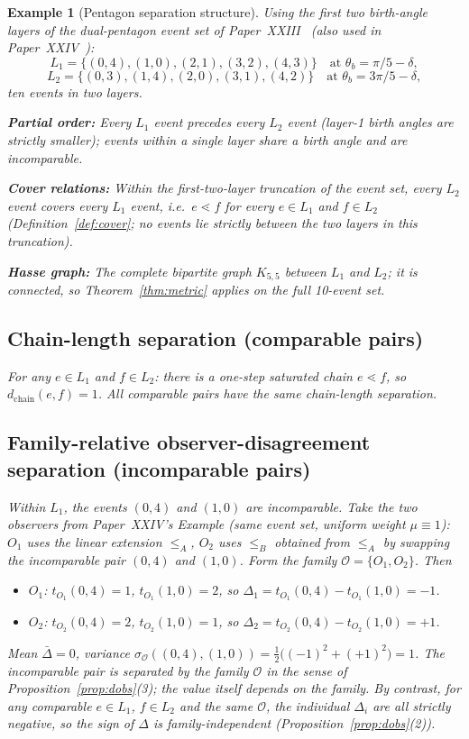 \documentclass[12pt]{article}
\newtheorem{example}[theorem]{Example}
\newcommand{\Ocal}{\mathcal{O}}
\begin{document}
\begin{example}[Pentagon separation structure]\label{ex:pentagon}
Using the first two birth-angle layers of the dual-pentagon event set of Paper~XXIII~\citep{SmartXXIII} (also used in Paper~XXIV~\citep{SmartXXIV}):
\[
    L_1 = \{(0,4),(1,0),(2,1),(3,2),(4,3)\} \quad \text{at } \theta_b = \pi/5 - \delta,
\]
\[
    L_2 = \{(0,3),(1,4),(2,0),(3,1),(4,2)\} \quad \text{at } \theta_b = 3\pi/5 - \delta,
\]
ten events in two layers.

\textbf{Partial order:} Every $L_1$ event precedes every $L_2$ event (layer-1 birth angles are strictly smaller); events within a single layer share a birth angle and are incomparable.

\textbf{Cover relations:} Within the first-two-layer truncation of the event set, every $L_2$ event covers every $L_1$ event, i.e.\ $e \lessdot f$ for every $e \in L_1$ and $f \in L_2$ (Definition~\ref{def:cover}; no events lie strictly between the two layers in this truncation).

\textbf{Hasse graph:} The complete bipartite graph $K_{5,5}$ between $L_1$ and $L_2$; it is connected, so Theorem~\ref{thm:metric} applies on the full 10-event set.

\subsection*{Chain-length separation (comparable pairs)}

For any $e \in L_1$ and $f \in L_2$: there is a one-step saturated chain $e \lessdot f$, so $d_{\mathrm{chain}}(e, f) = 1$. All comparable pairs have the same chain-length separation.

\subsection*{Family-relative observer-disagreement separation (incomparable pairs)}

Within $L_1$, the events $(0,4)$ and $(1,0)$ are incomparable. Take the two observers from Paper~XXIV's Example (same event set, uniform weight $\mu \equiv 1$): $O_1$ uses the linear extension $\leq_A$, $O_2$ uses $\leq_B$ obtained from $\leq_A$ by swapping the incomparable pair $(0,4)$ and $(1,0)$. Form the family $\Ocal = \{O_1, O_2\}$. Then
\begin{itemize}
    \item $O_1$: $t_{O_1}(0,4) = 1$, $t_{O_1}(1,0) = 2$, so $\Delta_1 = t_{O_1}(0,4) - t_{O_1}(1,0) = -1$.
    \item $O_2$: $t_{O_2}(0,4) = 2$, $t_{O_2}(1,0) = 1$, so $\Delta_2 = t_{O_2}(0,4) - t_{O_2}(1,0) = +1$.
\end{itemize}
Mean $\bar\Delta = 0$, variance $\sigma_{\Ocal}((0,4),(1,0)) = \tfrac{1}{2}\bigl((-1)^2 + (+1)^2\bigr) = 1$. The incomparable pair is separated by the family $\Ocal$ in the sense of Proposition~\ref{prop:dobs}(3); the value itself depends on the family. By contrast, for any comparable $e \in L_1$, $f \in L_2$ and the same $\Ocal$, the individual $\Delta_i$ are all strictly negative, so the sign of $\Delta$ is family-independent (Proposition~\ref{prop:dobs}(2)).


\end{example}
\end{document}
